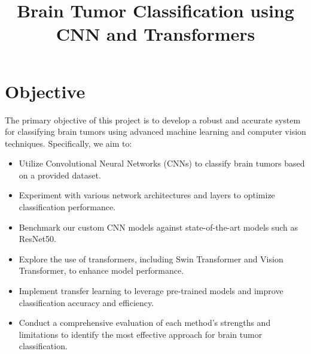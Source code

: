 \documentclass[conference]{IEEEtran}
\begin{document}
\title{Brain Tumor Classification using CNN and Transformers \\
}

\author{
\and
{}
\and
{}
\and
{}
\and
}

\maketitle

\section{Objective}
The primary objective of this project is to develop a robust and accurate system for classifying brain tumors using advanced machine learning and computer vision techniques. Specifically, we aim to:
\begin{itemize}
    \item Utilize Convolutional Neural Networks (CNNs) to classify brain tumors based on a provided dataset.
    \item Experiment with various network architectures and layers to optimize classification performance.
    \item Benchmark our custom CNN models against state-of-the-art models such as ResNet50.
    \item Explore the use of transformers, including Swin Transformer and Vision Transformer, to enhance model performance.
    \item Implement transfer learning to leverage pre-trained models and improve classification accuracy and efficiency.
    \item Conduct a comprehensive evaluation of each method’s strengths and limitations to identify the most effective approach for brain tumor classification.

\end{itemize}
\end{document}

